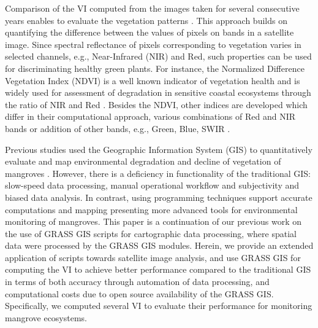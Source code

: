 \documentclass[jmse,article,submit,pdftex,moreauthors]{Definitions/mdpi}
\begin{document}
Comparison of the VI computed from the images taken for several consecutive years enables to evaluate the vegetation patterns \cite{OCHEGE2017211,Lemenkova202229}. This approach builds on quantifying the difference between the values of pixels on bands in a satellite image. Since spectral reflectance of pixels corresponding to vegetation varies in selected channels, e.g., Near-Infrared (NIR) and Red, such properties can be used for discriminating healthy green plants. For instance, the Normalized Difference Vegetation Index (NDVI) is a well known indicator of vegetation health and is widely used for assessment of degradation in sensitive coastal ecosystems through the ratio of NIR and Red \cite{alademomi2020assessing,NSE2020e00599}. Besides the NDVI, other indices are developed which differ in their computational approach, various combinations of Red and NIR bands or addition of other bands, e.g., Green, Blue, SWIR \cite{Adamu,rs10060897}. 

Previous studies used the Geographic Information System (GIS) to quantitatively evaluate and map environmental degradation and decline of vegetation of mangroves \cite{NUMBERE2022433,FASHAE2022e01286,Olorunfemi,Fagbeja,Enaruvbe2015}. However, there is a deficiency in functionality of the traditional GIS: slow-speed data processing, manual operational workflow and subjectivity and biased data analysis. In contrast, using programming techniques support accurate computations and mapping \cite{9883588,Lemenkova202227,9884244,Lemenkova202230,9964623} presenting more advanced tools for environmental monitoring of mangroves. This paper is a continuation of our previous work \cite{technologies11020046} on the use of GRASS GIS scripts for cartographic data processing, where spatial data were processed by the GRASS GIS modules. Herein, we provide an extended application of scripts towards satellite image analysis, and use GRASS GIS for computing the VI to achieve better performance compared to the traditional GIS in terms of both accuracy through automation of data processing, and computational costs due to open source availability of the GRASS GIS. Specifically, we computed several VI to evaluate their performance for monitoring mangrove ecosystems.
\end{document}
